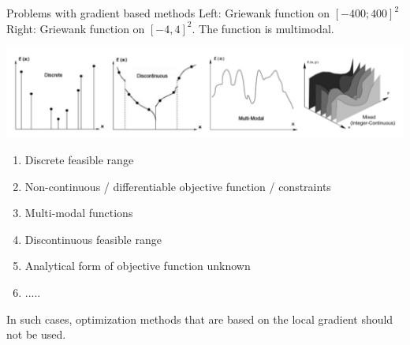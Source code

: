 \documentclass[11pt,compress,t,notes=noshow, xcolor=table]{beamer}
\begin{document}
\begin{vbframe}{Problems with gradient based methods}
Left: Griewank function on $[-400; 400]^2$\\Right: Griewank function on $[-4, 4]^2$. The function is multimodal.

\framebreak

\begin{center}
\includegraphics{figure_man/problems.png}
\end{center}

\begin{enumerate}
\item Discrete feasible range
\item Non-continuous / differentiable objective function / constraints
\item Multi-modal functions
\item Discontinuous feasible range
\item Analytical form of objective function unknown
\item .....
\end{enumerate}

In such cases, optimization methods that are based on the local gradient should not be used. 
\end{vbframe}

\endlecture
\end{document}
